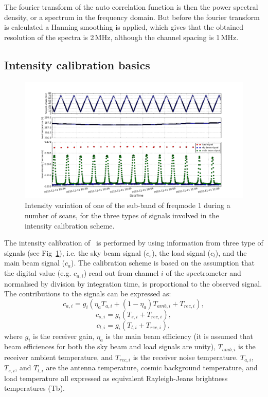 The fourier transform of the auto correlation function is then the
power spectral density, or a spectrum in the frequency domain. 
But before the fourier transform is calculated a Hanning smoothing is
applied, which gives that the obtained resolution of the spectra is 2\,MHz,
although the channel spacing is 1\,MHz.


\subsection{Intensity calibration basics}
\begin{figure}[t]
\includegraphics[width=14cm]{cal_signals.png}
\caption{ Intensity variation of one of the sub-band of freqmode 1 
during a number of scans, for the three types of signals involved 
in the intensity calibration scheme.} 
\label{fig:intensityvar}
\end{figure}



The intensity calibration of \smr\ is performed by using
information from three type of signals (see Fig~\ref{fig:intensityvar}), i.e. the sky beam signal
(\(c_{s}\)),
the load signal (\(c_{l}\)), and the main beam signal (\(c_{a}\)).
The calibration scheme is based on the assumption that the 
digital value (e.g. \(c_{a,i}\)) read out from channel \(i\) of the 
spectrometer and 
normalised by division by integration time, is proportional to the
observed signal. The contributions to the signals 
can be expressed as:
\begin{equation}
c_{a,i}=g_{i}\left(\eta_{a} T_{a,i}+(1-\eta_{a})T_{amb,i}+T_{rec,i}\right),
\end{equation}
\begin{equation}
\label{eq:skybeam}
c_{s,i}=g_{i}\left(T_{s,i}+T_{rec,i}\right),
\end{equation}
\begin{equation}
c_{l,i}=g_{i}\left(T_{l,i}+T_{rec,i}\right),
\end{equation}
where \(g_{i}\) is the receiver gain, \(\eta_{a}\) is the main beam
efficiency (it is assumed that beam efficiences for 
both the sky beam and load signals are unity), 
\(T_{amb,i}\) is the receiver ambient temperature,
and \(T_{rec,i}\) is the receiver noise temperature.
\(T_{a,i}\), \(T_{s,i}\), and \(T_{l,i}\) are the antenna temperature,
cosmic background temperature, and load temperature all expressed
as equivalent Rayleigh-Jeans brightness temperatures (Tb).

